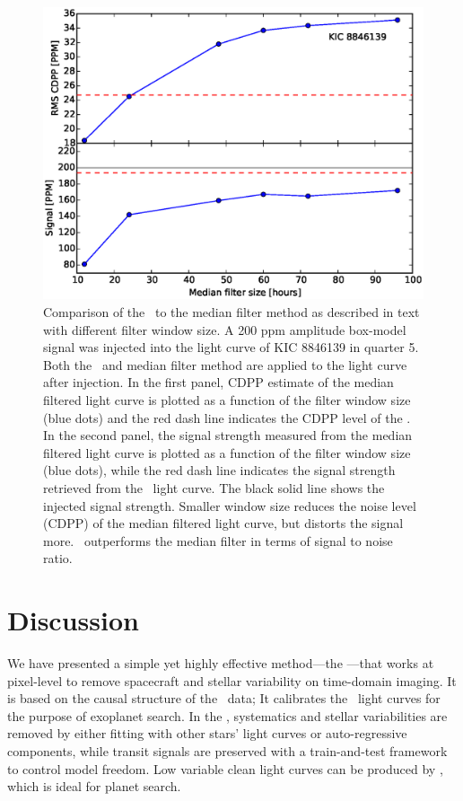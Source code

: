 \begin{figure}[p]
\begin{center}
\includegraphics[width=\textwidth]{figures/cpm/f7a}
\end{center}
\caption{
  \label{filter} 
Comparison of the \name\ to the median filter method as described in text with different filter window size. A 200 ppm amplitude box-model signal was injected into the light curve of KIC 8846139 in quarter 5. Both the \name\ and median filter method are applied to the light curve after injection. In the first panel, CDPP estimate of the median filtered light curve is plotted as a function of the filter window size (blue dots) and the red dash line indicates the CDPP level of the \name. In the second panel, the signal strength measured from the median filtered light curve is plotted as a function of the filter window size (blue dots), while the red dash line indicates the signal strength retrieved from the \name\ light curve. The black solid line shows the injected signal strength. Smaller window size reduces the noise level (CDPP) of the median filtered light curve, but distorts the signal more. \name\ outperforms the median filter in terms of signal to noise ratio.
}
\end{figure}

\section{Discussion}
We have presented a simple yet highly effective method---the \name---that works at pixel-level to remove spacecraft and stellar variability on time-domain imaging. It is based on the causal structure of the \Kepler\ data; It calibrates the \Kepler\ light curves for the purpose of exoplanet search.
In the \name, systematics and stellar variabilities are removed by either fitting with other stars' light curves or auto-regressive components, while transit signals are preserved with a train-and-test framework to control model freedom.
Low variable clean light curves can be produced by \name, which is ideal for planet search. 

